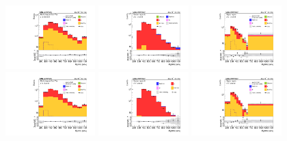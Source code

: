 \begin{figure}[tbp]
  \begin{center}
    \includegraphics[width=0.31\textwidth]{figures/hhMt_mm_CRDY_FullPostfit_plot_nov16_2_graviton.pdf}
    \includegraphics[width=0.31\textwidth]{figures/hhMt_mm_CRTT_FullPostfit_plot_nov16_2_graviton.pdf}
    \includegraphics[width=0.31\textwidth]{figures/hhMt_mm_SR_FullPostfit_plot_nov16_2_graviton.pdf} \\
    \includegraphics[width=0.31\textwidth]{figures/hhMt_ee_CRDY_FullPostfit_plot_nov16_2_graviton.pdf}
    \includegraphics[width=0.31\textwidth]{figures/hhMt_ee_CRTT_FullPostfit_plot_nov16_2_graviton.pdf}
    \includegraphics[width=0.31\textwidth]{figures/hhMt_ee_SR_FullPostfit_plot_nov16_2_graviton.pdf}

\end{center}
\end{figure}
